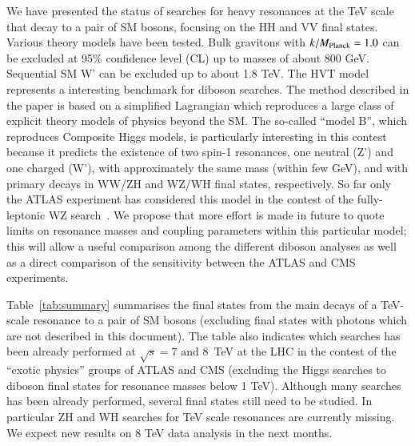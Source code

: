 \documentclass[3p,times,twocolumn]{elsarticle}
\begin{document}
We have presented the status of searches for heavy resonances
at the TeV scale that decay to a pair of SM bosons, focusing 
on the HH and VV final states. Various theory models have
been tested. Bulk gravitons with $k/M_{\rm{Planck}} = 1.0$ 
can be excluded at 95\% confidence level (CL) up to masses of about
800 GeV. Sequential SM W' can be excluded up to about 1.8 TeV.
The HVT model~\cite{Pappadopulo:2014qza} represents a interesting benchmark 
for diboson searches. The method described in the paper is based on a
simplified Lagrangian which reproduces a large class of explicit
theory models of physics beyond the SM. The so-called ``model B'',
which reproduces Composite Higgs models, is particularly interesting in
this contest because it predicts the existence of two spin-1
resonances, one neutral (Z') and one charged (W'), with approximately the same
mass (within few GeV), and with primary decays in WW/ZH and WZ/WH
final states, respectively. So far only the ATLAS experiment has considered this
model in the contest of the fully-leptonic WZ
search~\cite{Aad:2014pha}. We propose that more effort is made in
future to quote limits on resonance masses and coupling parameters within
this particular model; this will allow a useful comparison among the different
diboson analyses as well as a direct comparison of the sensitivity between the
ATLAS and CMS experiments.

Table~\ref{tab:summary} summarises the final states from
the main decays of a TeV-scale resonance to a pair of SM bosons (excluding 
final states with photons which are not described in this document). 
The table also indicates which searches has been already performed at
$\sqrt{s}=7\mbox{ and } 8$~TeV at the LHC in the contest of the ``exotic
physics'' groups of ATLAS and CMS (excluding the Higgs 
searches to diboson final states for resonance masses below 1 TeV). 
Although many searches has been already performed, 
several final states still need to be studied. In particular ZH and WH
searches for TeV scale resonances are currently missing. We expect new
results on 8 TeV data analysis in the next months.
\end{document}
